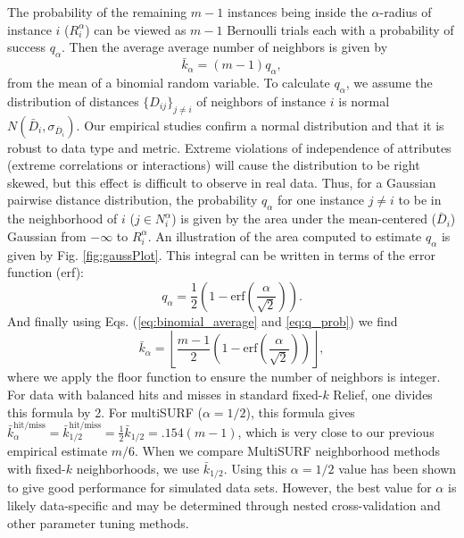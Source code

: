 \documentclass[10pt,letterpaper]{article}\usepackage[]{graphicx}\usepackage[]{color}
\begin{document}
The probability of the remaining $m-1$ instances being inside the $\alpha$-radius of instance $i$ ($R_i^{\alpha}$) can be viewed as $m-1$ Bernoulli trials each with a probability of success $q_{\alpha}$. Then the average average number of neighbors is given by
\begin{equation}
\label{eq:binomial_average}
  {\bar{k}}_{\alpha} = (m-1)q_{\alpha},
\end{equation}
from the mean of a binomial random variable. To calculate $q_{\alpha}$, we assume the distribution of distances $\{D_{ij} \}_{j \ne i}$ of neighbors of instance $i$ is normal $N(\bar{D}_i,\sigma_{\bar{D}_i})$. Our empirical studies confirm a normal distribution and that it is robust to data type and metric. Extreme violations of independence of attributes (extreme correlations or interactions) will cause the distribution to be right skewed, but this effect is difficult to observe in real data. Thus, for a Gaussian pairwise distance distribution, the probability $q_{\alpha}$ for one instance $j \ne i$ to be in the neighborhood of $i$ ($j \in N^{\alpha}_{i}$) is given by the area under the mean-centered ($\bar{D}_i$) Gaussian from $-\infty$ to $R_i^{\alpha}$. An illustration of the area computed to estimate $q_{\alpha}$ is given by Fig. \ref{fig:gaussPlot}. This integral can be written in terms of the error function (erf):
\begin{equation}
\label{eq:q_prob}
q_{\alpha} = \frac{1}{2} \left( 1 - \mathrm{erf}\left( \frac{\alpha}{\sqrt{2}} \right) \right).
\end{equation}
And finally using Eqs. (\ref{eq:binomial_average} and \ref{eq:q_prob}) we find
\begin{equation}\label{eq:kbar}
{\bar{k}}_{\alpha} = \left \lfloor \frac{m-1}{2}  \left( 1 - \mathrm{erf}\left( \frac{\alpha}{\sqrt{2}} \right) \right) \right \rfloor,
\end{equation}
where we apply the floor function to ensure the number of neighbors is integer. For data with balanced hits and misses in standard fixed-$k$ Relief, one divides this formula by 2. For multiSURF ($\alpha=1/2$), this formula gives $\bar{k}_{\alpha}^{\text{hit/miss}} = \bar{k}_{1/2}^{\text{hit/miss}} = \frac{1}{2}\bar{k}_{1/2} = .154 (m-1)$, which is very close to our previous empirical estimate $m/6$. When we compare MultiSURF neighborhood methods with fixed-$k$ neighborhoods, we use $\bar{k}_{1/2}$. Using this $\alpha=1/2$ value has been shown to give good performance for simulated data sets. However, the best value for $\alpha$ is likely data-specific and may be determined through nested cross-validation and other parameter tuning methods.
\end{document}
